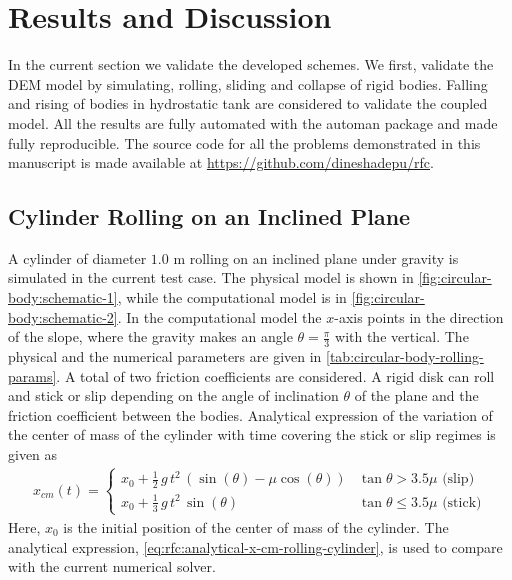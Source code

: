 \FloatBarrier%
\section{Results and Discussion}
\label{sec:rfc:results}
In the current section we validate the developed schemes. We first, validate the
DEM model by simulating, rolling, sliding and collapse of rigid bodies. Falling
and rising of bodies in hydrostatic tank are considered to validate the coupled
model. All the results are fully automated with the automan package
\parencite{automan2018} and made fully reproducible. The source code for all the
problems demonstrated in this manuscript is made available at
\url{https://github.com/dineshadepu/rfc}.


\FloatBarrier%
\subsection{Cylinder Rolling on an Inclined Plane}
\label{sec:cylinder-rolling-on-an-inclined-plane}
A cylinder of diameter $1.0$ m rolling on an inclined plane under gravity is
simulated in the current test case. The physical model is shown in
\cref{fig:circular-body:schematic-1}, while the computational model is in
\cref{fig:circular-body:schematic-2}. In the computational model the $x$-axis
points in the direction of the slope, where the gravity makes an angle
$\theta=\frac{\pi}{3}$ with the vertical. The physical and the numerical
parameters are given in \cref{tab:circular-body-rolling-params}. A total of two
friction coefficients are considered. A rigid disk can roll and stick or slip
depending on the angle of inclination $\theta$ of the plane and the friction
coefficient between the bodies. Analytical expression of the variation of the
center of mass of the cylinder with time covering the stick or slip regimes is
given as
\begin{align}
  \label{eq:rfc:analytical-x-cm-rolling-cylinder}
  x_{cm}(t) =
  \begin{cases}
  x_0 + \frac{1}{2} \, g \, t^2 \, (\sin(\theta) - \mu \cos(\theta)) & \tan{\theta} > 3.5\mu \text{ (slip)}\\
  x_0 + \frac{1}{3} \, g \, t^2 \, \sin(\theta) & \tan{\theta} \leq 3.5\mu \text{ (stick)}
\end{cases}
\end{align}
Here, $x_0$ is the initial position of the center of mass of the cylinder. The
analytical expression, \cref{eq:rfc:analytical-x-cm-rolling-cylinder}, is used
to compare with the current numerical solver.
